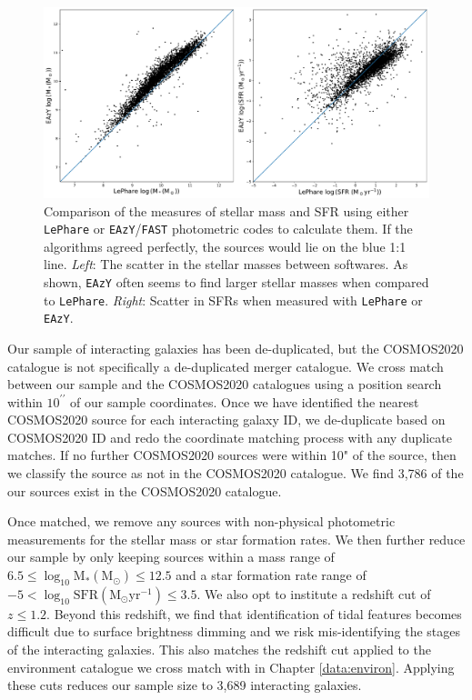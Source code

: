 \begin{figure}
\centering
\includegraphics[width=\textwidth]{Chapter3/figures/mass-sfr-scatter.pdf}
\caption[Comparison of the measures of stellar mass and SFR using either \texttt{LePhare} or \texttt{EAzY}/\texttt{FAST} photometric codes to calculate them.]{Comparison of the measures of stellar mass and SFR using either \texttt{LePhare} or \texttt{EAzY}/\texttt{FAST} photometric codes to calculate them. If the algorithms agreed perfectly, the sources would lie on the blue 1:1 line. \textit{Left}: The scatter in the stellar masses between softwares. As shown, \texttt{EAzY} often seems to find larger stellar masses when compared to \texttt{LePhare}. \textit{Right}: Scatter in SFRs when measured with \texttt{LePhare} or \texttt{EAzY}.}
\label{fig:difference-measures}
\end{figure}

Our sample of interacting galaxies has been de-duplicated, but the COSMOS2020 catalogue is not specifically a de-duplicated merger catalogue. We cross match between our sample and the COSMOS2020 catalogues using a position search within $10^{\prime\prime}$ of our sample coordinates. Once we have identified the nearest COSMOS2020 source for each interacting galaxy ID, we de-duplicate based on COSMOS2020 ID and redo the coordinate matching process with any duplicate matches. If no further COSMOS2020 sources were within 10" of the source, then we classify the source as not in the COSMOS2020 catalogue. We find 3,786 of the our sources exist in the COSMOS2020 catalogue.

Once matched, we remove any sources with non-physical photometric measurements for the stellar mass or star formation rates. We then further reduce our sample by only keeping sources within a mass range of $6.5 \leq \log_{10} \text{M}_{*}(\text{M}_{\odot}) \leq 12.5$ and a star formation rate range of $-5 < \log_{10} \text{SFR} (\text{M}_{\odot}\text{yr}^{-1}) \leq 3.5$. We also opt to institute a redshift cut of $z \leq 1.2$. Beyond this redshift, we find that identification of tidal features becomes difficult due to surface brightness dimming and we risk mis-identifying the stages of the interacting galaxies. This also matches the redshift cut applied to the environment catalogue we cross match with in Chapter \ref{data:environ}. Applying these cuts reduces our sample size to 3,689 interacting galaxies.

